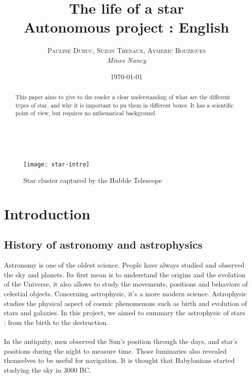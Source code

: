 \documentclass[a4paper, 11pt]{article} %
\title{\textbf{The life of a star}\\ %
Autonomous project : English} %
\author{\textsc{Pauline Dubuc, Suzon Thenaux, Aymeric Bouzigues} %
\\{\textit{Mines Nancy}}} %
\date{\today} %
\makeatletter
\renewcommand{\maketitle}{ %
\begin{flushright} %
{\LARGE\@title} %

\vspace{30pt} %

{\large\@author} %
\\\@date %

\vspace{20pt} %
\end{flushright}
}
\makeatother
\begin{document}
\maketitle %



\begin{abstract}

This paper aims to give to the reader a clear understanding of what are the different types of star, and why it is important to pu them in different boxes. It has a scientific point of view, but requires no mthematical background.

\end{abstract}


\begin{figure}[h]
\centering
\texttt{[image: star-intro]}
\captionsetup{labelformat=empty}
\caption{Star cluster captured by the Hubble Telescope}
\end{figure}
\newpage
\tableofcontents
\newpage
\section*{Introduction}

\subsection*{History of astronomy and astrophysics}

Astronomy is one of the oldest science. People have always studied and observed the sky and planets. Its first mean is to understand the origins and the evolution of the Universe, it also allows to study the movements, positions and behaviors of celestial objects. Concerning astrophysic, it's a more modern science. Astrophysic studies the physical aspect of cosmic phenomenons such as birth and evolution of stars and galaxies. In this project, we aimed to summary the astrophysic of stars : from the birth to the destruction.
\paragraph*{}
In the antiquity, men observed the Sun's position through the days, and star's positions during the night to measure time. Those luminaries also revealed themselves to be useful for navigation. It is thought that Babylonians started studying the sky in 3000 BC. 
\end{document}
